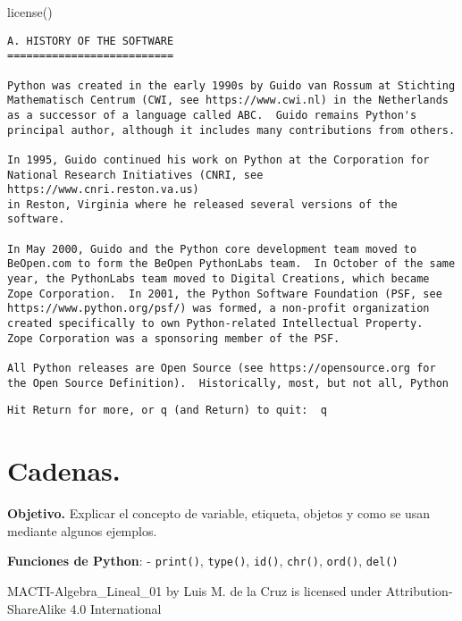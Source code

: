 \documentclass[
  letterpaper,
  DIV=11,
  numbers=noendperiod]{scrreprt}
\newenvironment{Shaded}{\begin{snugshade}}{\end{snugshade}}
\newcommand{\NormalTok}[1]{\textcolor[rgb]{0.00,0.23,0.31}{#1}}
\begin{document}
\begin{Shaded}
\begin{Highlighting}[]
\NormalTok{license()}
\end{Highlighting}
\end{Shaded}

\begin{verbatim}
A. HISTORY OF THE SOFTWARE
==========================

Python was created in the early 1990s by Guido van Rossum at Stichting
Mathematisch Centrum (CWI, see https://www.cwi.nl) in the Netherlands
as a successor of a language called ABC.  Guido remains Python's
principal author, although it includes many contributions from others.

In 1995, Guido continued his work on Python at the Corporation for
National Research Initiatives (CNRI, see https://www.cnri.reston.va.us)
in Reston, Virginia where he released several versions of the
software.

In May 2000, Guido and the Python core development team moved to
BeOpen.com to form the BeOpen PythonLabs team.  In October of the same
year, the PythonLabs team moved to Digital Creations, which became
Zope Corporation.  In 2001, the Python Software Foundation (PSF, see
https://www.python.org/psf/) was formed, a non-profit organization
created specifically to own Python-related Intellectual Property.
Zope Corporation was a sponsoring member of the PSF.

All Python releases are Open Source (see https://opensource.org for
the Open Source Definition).  Historically, most, but not all, Python
\end{verbatim}

\begin{verbatim}
Hit Return for more, or q (and Return) to quit:  q
\end{verbatim}


\chapter{Cadenas.}\label{cadenas.}

\textbf{Objetivo.} Explicar el concepto de variable, etiqueta, objetos y
como se usan mediante algunos ejemplos.

\textbf{Funciones de Python}: - \texttt{print()}, \texttt{type()},
\texttt{id()}, \texttt{chr()}, \texttt{ord()}, \texttt{del()}

MACTI-Algebra\_Lineal\_01 by Luis M. de la Cruz is licensed under
Attribution-ShareAlike 4.0 International
\end{document}
